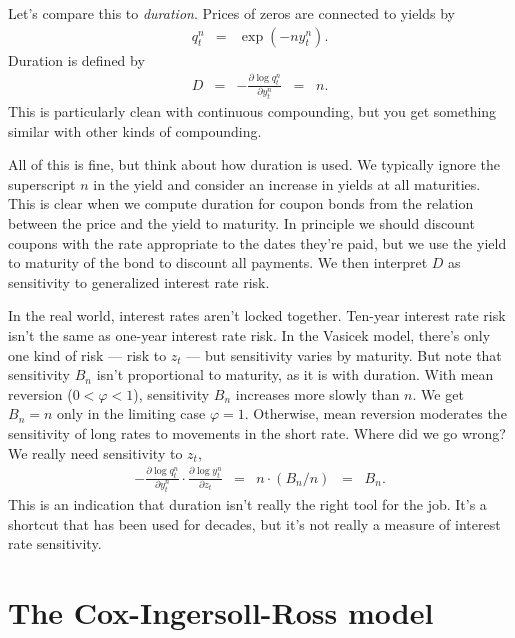 \documentclass[11pt]{article}
\begin{document}
Let's compare this to {\it duration\/}.
Prices of zeros are connected to yields by
\begin{eqnarray*}
    q^n_t &=& \exp( - n y^n_t ).
\end{eqnarray*}
Duration is defined by
\begin{eqnarray*}
    D &=& - \frac{\partial \log q^n_t}{\partial y^n_t} \;\;=\;\; n.
\end{eqnarray*}
This is particularly clean with continuous compounding,
but you get something similar with other kinds of compounding.

All of this is fine, but think about how duration is used.
We typically ignore the superscript $n$ in the yield and consider
an increase in yields at all maturities.
This is clear when we compute duration for coupon bonds from the
relation between the price and the yield to maturity.
In principle we should discount coupons with the rate appropriate
to the dates they're paid, but we use the yield to maturity
of the bond to discount all payments.
We then interpret $D$ as sensitivity to generalized interest rate risk.

In the real world, interest rates aren't locked together.
Ten-year interest rate risk isn't the same as one-year interest rate risk.
In the Vasicek model, there's only one kind of risk --- risk to $z_t$ ---
but sensitivity varies by maturity.
But note that sensitivity $B_n$ isn't proportional to maturity,
as it is with duration.
With mean reversion ($0 < \varphi < 1$), sensitivity $B_n$ increases more slowly than $n$.
We get $B_n = n$ only in the limiting case $\varphi = 1$.
Otherwise, mean reversion moderates the sensitivity of long rates to movements in
the short rate.
Where did we go wrong?
We really need sensitivity to $z_t$,
\begin{eqnarray*}
     - \frac{\partial \log q^n_t}{\partial y^n_t}
      \cdot \frac{\partial \log y^n_t}{\partial z_t} &=& n \cdot (B_n/n) \;\;=\;\; B_n.
\end{eqnarray*}
This is an indication that duration isn't really the right tool for the job.
It's a shortcut that has been used for decades,
but it's not really a measure of interest rate sensitivity.



\section{The Cox-Ingersoll-Ross model}
\end{document}
